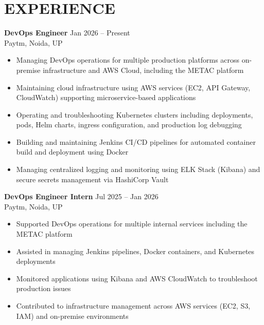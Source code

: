\documentclass[10pt,letterpaper]{article}
\begin{document}
\section*{EXPERIENCE}
\textbf{DevOps Engineer} \hfill Jan 2026 -- Present\\
Paytm, Noida, UP
\begin{itemize}
\item Managing DevOps operations for multiple production platforms across on-premise infrastructure and AWS Cloud, including the METAC platform
\item Maintaining cloud infrastructure using AWS services (EC2, API Gateway, CloudWatch) supporting microservice-based applications
\item Operating and troubleshooting Kubernetes clusters including deployments, pods, Helm charts, ingress configuration, and production log debugging
\item Building and maintaining Jenkins CI/CD pipelines for automated container build and deployment using Docker
\item Managing centralized logging and monitoring using ELK Stack (Kibana) and secure secrets management via HashiCorp Vault
\end{itemize}

\textbf{DevOps Engineer Intern} \hfill Jul 2025 -- Jan 2026\\
Paytm, Noida, UP
\begin{itemize}
\item Supported DevOps operations for multiple internal services including the METAC platform
\item Assisted in managing Jenkins pipelines, Docker containers, and Kubernetes deployments
\item Monitored applications using Kibana and AWS CloudWatch to troubleshoot production issues
\item Contributed to infrastructure management across AWS services (EC2, S3, IAM) and on-premise environments
\end{itemize}
\end{document}

